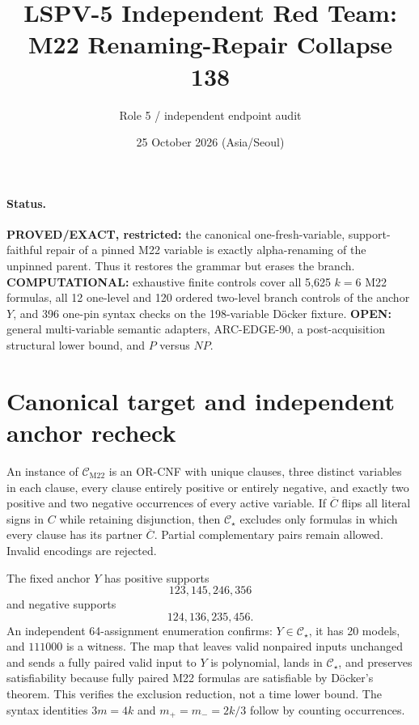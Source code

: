 \documentclass[11pt]{article}
\title{LSPV-5 Independent Red Team: M22 Renaming-Repair Collapse 138}
\author{Role 5 / independent endpoint audit}
\date{25 October 2026 (Asia/Seoul)}
\newcommand{\CM}{\mathcal C_{\mathrm{M22}}}
\newcommand{\Cs}{\mathcal C_\star}
\begin{document}
\sloppy
\maketitle

\paragraph{Status.}
\textbf{PROVED/EXACT, restricted:} the canonical one-fresh-variable,
support-faithful repair of a pinned M22 variable is exactly alpha-renaming of
the unpinned parent.  Thus it restores the grammar but erases the branch.
\textbf{COMPUTATIONAL:} exhaustive finite controls cover all 5,625
$k=6$ M22 formulas, all 12 one-level and 120 ordered two-level branch controls
of the anchor $Y$, and 396 one-pin syntax checks on the 198-variable D\"ocker
fixture.  \textbf{OPEN:} general multi-variable semantic adapters,
ARC-EDGE-90, a post-acquisition structural lower bound, and $P$ versus $NP$.

\section{Canonical target and independent anchor recheck}
An instance of $\CM$ is an OR-CNF with unique clauses, three distinct
variables in each clause, every clause entirely positive or entirely
negative, and exactly two positive and two negative occurrences of every
active variable.  If $\overline C$ flips all literal signs in $C$ while
retaining disjunction, then $\Cs$ excludes only formulas in which every
clause has its partner $\overline C$.  Partial complementary pairs remain
allowed.  Invalid encodings are rejected.

The fixed anchor $Y$ has positive supports
\[
123,145,246,356
\]
and negative supports
\[
124,136,235,456.
\]
An independent 64-assignment enumeration confirms: $Y\in\Cs$, it has 20
models, and $111000$ is a witness.  The map that leaves valid nonpaired
inputs unchanged and sends a fully paired valid input to $Y$ is polynomial,
lands in $\Cs$, and preserves satisfiability because fully paired M22
formulas are satisfiable by D\"ocker's theorem.  This verifies the exclusion
reduction, not a time lower bound.  The syntax identities
$3m=4k$ and $m_+=m_-=2k/3$ follow by counting occurrences.
\end{document}
